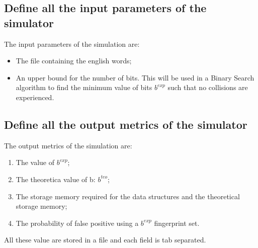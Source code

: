 \documentclass{report}
\begin{document}
				\subsection{Define all the input parameters of the simulator}
					The input parameters of the simulation are:
					\begin{itemize}
						\item The file containing the english words;
						\item An upper bound for the number of bits. This will be used in a Binary Search algorithm to find the minimum value of bits $b^{exp}$ such that no collisions are experienced.
					\end{itemize}
					 
				\subsection{Define all the output metrics of the simulator}
					The output metrics of the simulation are:
					\begin{enumerate}
							\item The value of $b^{exp}$;
							\item The theoretica value of b: $b^{teo}$;
							\item The storage  memory required for the data structures and the theoretical storage memory;
							\item The probability of false positive using a  $b^{exp}$ fingerprint set.
					\end{enumerate}
					All these value are stored in a file and each field is tab separated.
			
\end{document}

